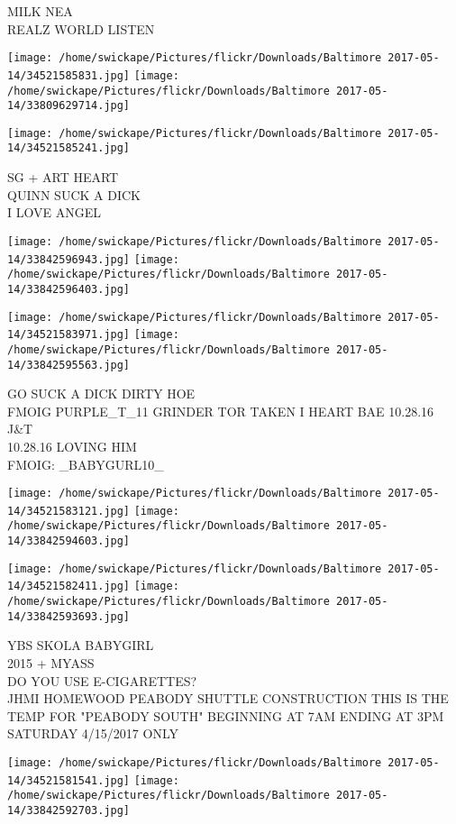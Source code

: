 \documentclass[10pt,letterpaper]{article}
\begin{document}
MILK NEA\\
REALZ WORLD LISTEN
\pagebreak

\texttt{[image: /home/swickape/Pictures/flickr/Downloads/Baltimore 2017-05-14/34521585831.jpg]}
\texttt{[image: /home/swickape/Pictures/flickr/Downloads/Baltimore 2017-05-14/33809629714.jpg]}

\vspace{0.25in}
\texttt{[image: /home/swickape/Pictures/flickr/Downloads/Baltimore 2017-05-14/34521585241.jpg]}

SG + ART HEART\\
QUINN SUCK A DICK\\
I LOVE ANGEL
\pagebreak

\texttt{[image: /home/swickape/Pictures/flickr/Downloads/Baltimore 2017-05-14/33842596943.jpg]}
\texttt{[image: /home/swickape/Pictures/flickr/Downloads/Baltimore 2017-05-14/33842596403.jpg]}

\texttt{[image: /home/swickape/Pictures/flickr/Downloads/Baltimore 2017-05-14/34521583971.jpg]}
\texttt{[image: /home/swickape/Pictures/flickr/Downloads/Baltimore 2017-05-14/33842595563.jpg]}

GO SUCK A DICK DIRTY HOE\\
FMOIG PURPLE\_T\_11 GRINDER TOR TAKEN I HEART BAE  10.28.16 J\&T\\
10.28.16 LOVING HIM\\
FMOIG: \_BABYGURL10\_
\pagebreak

\texttt{[image: /home/swickape/Pictures/flickr/Downloads/Baltimore 2017-05-14/34521583121.jpg]}
\texttt{[image: /home/swickape/Pictures/flickr/Downloads/Baltimore 2017-05-14/33842594603.jpg]}

\texttt{[image: /home/swickape/Pictures/flickr/Downloads/Baltimore 2017-05-14/34521582411.jpg]}
\texttt{[image: /home/swickape/Pictures/flickr/Downloads/Baltimore 2017-05-14/33842593693.jpg]}

YBS SKOLA BABYGIRL\\
2015 + MYASS\\
DO YOU USE E{-}CIGARETTES?\\
JHMI HOMEWOOD PEABODY SHUTTLE CONSTRUCTION THIS IS THE TEMP FOR "PEABODY SOUTH" BEGINNING AT 7AM ENDING AT 3PM SATURDAY 4/15/2017 ONLY
\pagebreak

\texttt{[image: /home/swickape/Pictures/flickr/Downloads/Baltimore 2017-05-14/34521581541.jpg]}
\texttt{[image: /home/swickape/Pictures/flickr/Downloads/Baltimore 2017-05-14/33842592703.jpg]}
\end{document}

